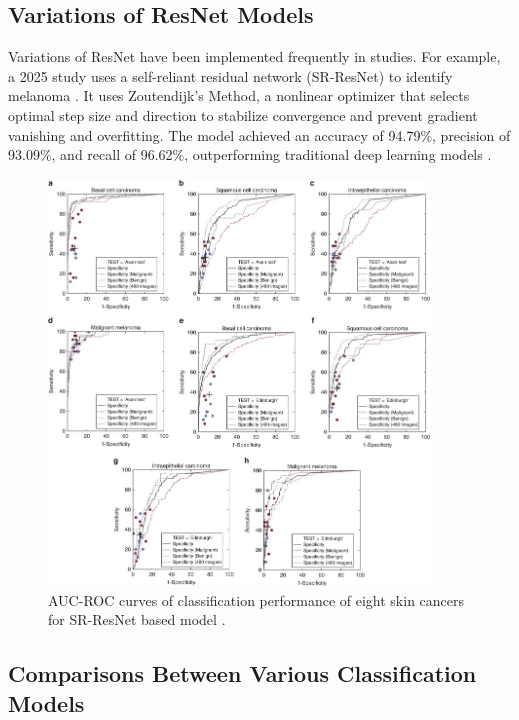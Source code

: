 \documentclass{article} %
\begin{document}
\subsection{Variations of ResNet Models}

Variations of ResNet have been implemented frequently in studies. For example, a 2025 study uses a self-reliant residual network (SR-ResNet) to identify melanoma \citep{radhika2025self}. It uses Zoutendijk's Method, a nonlinear optimizer that selects optimal step size and direction to stabilize convergence and prevent gradient vanishing and overfitting. The model achieved an accuracy of 94.79\%, precision of 93.09\%, and recall of 96.62\%, outperforming traditional deep learning models \citep{radhika2025self}.

\clearpage

\begin{figure}[h]
\begin{center}
\includegraphics[width=0.9\textwidth]{Figs/auc_roc_sr_resnet.png}
\end{center}
\caption{AUC-ROC curves of classification performance of eight skin cancers for SR-ResNet based model \citep{radhika2025self}.}
\end{figure}

\subsection{Comparisons Between Various Classification Models}
\end{document}
